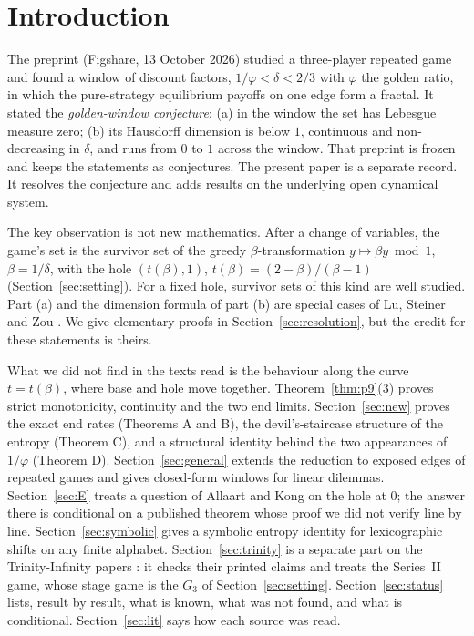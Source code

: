 \documentclass[11pt]{amsart}
\theoremstyle{remark}
\begin{document}
\maketitle

\section{Introduction}

The preprint \cite{v1} (Figshare, 13 October 2026) studied a three-player repeated game and found a window of discount factors, $1/\varphi<\delta<2/3$ with $\varphi$ the golden ratio, in which the pure-strategy equilibrium payoffs on one edge form a fractal. It stated the \emph{golden-window conjecture}: (a) in the window the set has Lebesgue measure zero; (b) its Hausdorff dimension is below $1$, continuous and non-decreasing in $\delta$, and runs from $0$ to $1$ across the window. That preprint is frozen and keeps the statements as conjectures. The present paper is a separate record. It resolves the conjecture and adds results on the underlying open dynamical system.

The key observation is not new mathematics. After a change of variables, the game's set is the survivor set of the greedy $\beta$-transformation $y\mapsto\beta y \bmod 1$, $\beta=1/\delta$, with the hole $(t(\beta),1)$, $t(\beta)=(2-\beta)/(\beta-1)$ (Section~\ref{sec:setting}). For a fixed hole, survivor sets of this kind are well studied. Part (a) and the dimension formula of part (b) are special cases of Lu, Steiner and Zou \cite[Theorem~1.2, Proposition~2.5]{LSZ}. We give elementary proofs in Section~\ref{sec:resolution}, but the credit for these statements is theirs.

What we did not find in the texts read is the behaviour along the curve $t=t(\beta)$, where base and hole move together. Theorem~\ref{thm:p9}(3) proves strict monotonicity, continuity and the two end limits. Section~\ref{sec:new} proves the exact end rates (Theorems A and B), the devil's-staircase structure of the entropy (Theorem C), and a structural identity behind the two appearances of $1/\varphi$ (Theorem D). Section~\ref{sec:general} extends the reduction to exposed edges of repeated games and gives closed-form windows for linear dilemmas. Section~\ref{sec:E} treats a question of Allaart and Kong on the hole at $0$; the answer there is conditional on a published theorem whose proof we did not verify line by line. Section~\ref{sec:symbolic} gives a symbolic entropy identity for lexicographic shifts on any finite alphabet. Section~\ref{sec:trinity} is a separate part on the Trinity-Infinity papers \cite{SeriesI,SeriesII,SeriesIII}: it checks their printed claims and treats the Series~II game, whose stage game is the $G_3$ of Section~\ref{sec:setting}. Section~\ref{sec:status} lists, result by result, what is known, what was not found, and what is conditional. Section~\ref{sec:lit} says how each source was read.
\end{document}
